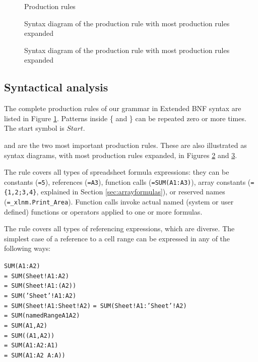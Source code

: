 \documentclass[conference]{IEEEtran}
\begin{document}
\begin{figure}
\caption{Production rules}
\label{figure:productions}
\centering

\end{figure}

\begin{figure}
	\caption{Syntax diagram of the  production rule with most production rules expanded}
	\label{figure:Formula}
	
\end{figure}
\begin{figure}
	\caption{Syntax diagram of the  production rule with most production rules expanded}
	\label{figure:Reference}
	\centering
	
\end{figure}

\subsection{Syntactical analysis}
\label{subsection:productionRules}

The complete production rules of our grammar in Extended BNF syntax are listed in Figure \ref{figure:productions}.
Patterns inside \{ and \} can be repeated zero or more times.
The start symbol is $Start$.

 and  are the two most important production rules.
These are also illustrated as syntax diagrams, with most production rules expanded, in Figures \ref{figure:Formula} and \ref{figure:Reference}.

The  rule covers all types of spreadsheet formula expressions: they can be constants (\texttt{=5}), references (\texttt{=A3}), function calls (\texttt{=SUM(A1:A3)}), array constants (\texttt{=\{1,2;3,4\}}, explained in Section \ref{sec:arrayformulas}), or reserved names (\texttt{=_xlnm.Print_Area}). Function calls invoke actual named (system or user defined) functions or operators applied to one or more formulas.

The  rule covers all types of referencing expressions, which are diverse. The simplest case of a reference to a cell range can be expressed in any of the following ways:

\begin{multicols}{2}
	\texttt{SUM(A1:A2)} \\ 
	\texttt{= SUM(Sheet!A1:A2)} \\
	\texttt{= SUM(Sheet!A1:(A2))} \\
	\texttt{= SUM('Sheet'!A1:A2)} \\
	\texttt{= SUM(Sheet!A1:Sheet!A2)}
		\columnbreak
	\texttt{= SUM(Sheet!A1:'Sheet'!A2)} \\
	\texttt{= SUM(namedRangeA1A2)} \\ 
	\texttt{= SUM(A1,A2)} \\ 
	\texttt{= SUM((A1,A2))} \\ 
	\texttt{= SUM(A1:A2:A1)} \\
	\texttt{= SUM(A1:A2 A:A))} 
\end{multicols}
\end{document}
